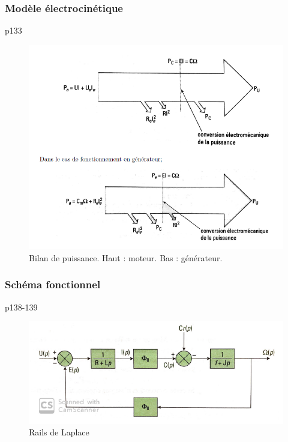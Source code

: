 \documentclass[11pt,a4paper]{report}
\begin{document}
\subsubsection{Modèle électrocinétique}
p133
\begin{figure}[h!]
	\begin{center}
		\includegraphics[scale = 0.50]{bilan_puissance.png}
		\caption{Bilan de puissance. Haut : moteur. Bas : générateur.} 
		\label{fig:rails_Laplace}
	\end{center}
\end{figure}

\subsubsection{Schéma fonctionnel}
p138-139

\begin{figure}[h!]
	\begin{center}
		\includegraphics[scale = 0.70]{aservissement.png}
		\caption{Rails de Laplace} 
		\label{fig:rails_Laplace}
	\end{center}
\end{figure}
\end{document}
